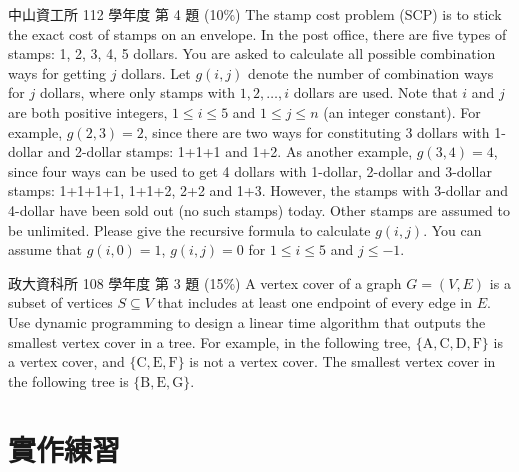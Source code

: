 \begin{pastexam}[label={px:dp-4}]{中山資工所 112 學年度 第 4 題}
(10\%) The stamp cost problem (SCP) is to stick the exact cost of stamps on an envelope. In the post office, there are five types of stamps: 1, 2, 3, 4, 5 dollars. You are asked to calculate all possible combination ways for getting $j$ dollars. Let $g(i,j)$ denote the number of combination ways for $j$ dollars, where only stamps with $1, 2, \ldots, i$ dollars are used. Note that $i$ and $j$ are both positive integers, $1\le i\le 5$ and $1\le j\le n$ (an integer constant). For example, $g(2,3)=2$, since there are two ways for constituting 3 dollars with 1-dollar and 2-dollar stamps: 1+1+1 and 1+2. As another example, $g(3,4)=4$, since four ways can be used to get 4 dollars with 1-dollar, 2-dollar and 3-dollar stamps: 1+1+1+1, 1+1+2, 2+2 and 1+3. However, the stamps with 3-dollar and 4-dollar have been sold out (no such stamps) today. Other stamps are assumed to be unlimited. Please give the recursive formula to calculate $g(i,j)$. You can assume that $g(i,0)=1$, $g(i,j)=0$ for $1\le i\le 5$ and $j\le -1$.
\end{pastexam}

\begin{pastexam}[label={px:dp-5}]{政大資科所 108 學年度 第 3 題}
(15\%) A vertex cover of a graph $G=(V,E)$ is a subset of vertices $S\subseteq V$ that includes at least one endpoint of every edge in $E$. Use dynamic programming to design a linear time algorithm that outputs the smallest vertex cover in a tree. For example, in the following tree, $\{\mathrm{A,C,D,F}\}$ is a vertex cover, and $\{\mathrm{C,E,F}\}$ is not a vertex cover. The smallest vertex cover in the following tree is $\{\mathrm{B,E,G}\}$.
\begin{center}
\end{center}
\end{pastexam}

\section{實作練習}
\label{sec:dp-practice}

